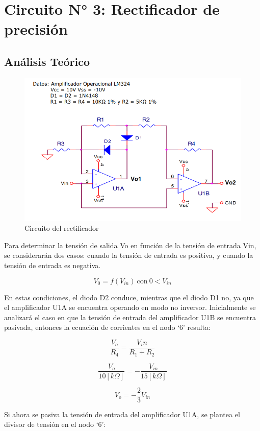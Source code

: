\section{Circuito N° 3: Rectificador de precisión }

\subsection{Análisis Teórico}

\begin{figure}[H]
    \centering
    \includegraphics[width=0.5\linewidth]{Secciones/Circuito3/circuito.png}
    \caption{Circuito del rectificador}
    \label{fig:Circuito3}
\end{figure}

Para determinar la tensión de salida Vo en función de la tensión de entrada Vin, se considerarán dos casos: cuando la tensión de entrada es positiva, y cuando la tensión de entrada es negativa.

\[V_0 = f(V_{in}) \ \text{con} \ 0 < V_{in}\]

En estas condiciones, el diodo D2 conduce, mientras que el diodo D1 no, ya que el amplificador U1A se encuentra operando en modo no inversor.
Inicialmente se analizará el caso en que la tensión de entrada del amplificador U1B se encuentra pasivada, entonces la ecuación de corrientes en el nodo ‘6’ resulta:

\begin{equation}
\frac{V_o}{R_4} = \frac{V_in}{R_1 + R_2}
\end{equation}

\begin{equation}
\frac{V_o}{10[k\Omega]} = -\frac{V_{in}}{15[k\Omega]}
\end{equation}

\begin{equation}
V_o = - \frac{2}{3}V_{in}
\end{equation}

Si ahora se pasiva la tensión de entrada del amplificador U1A, se plantea el divisor de tensión en el nodo ‘6’:

